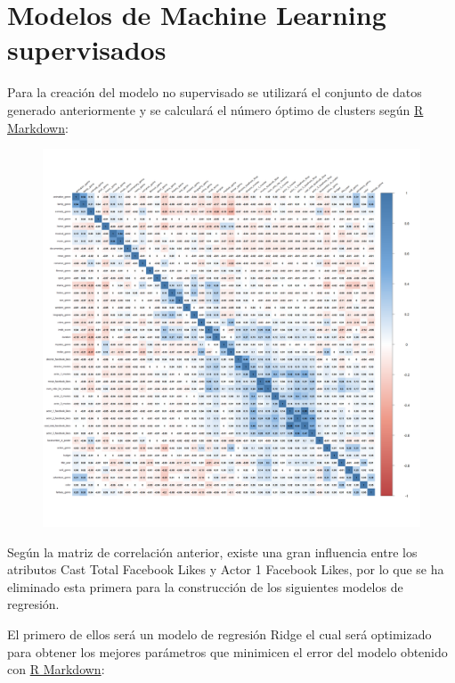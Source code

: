\documentclass{article}
\begin{document}
\clearpage

\section{Modelos de Machine Learning supervisados}

Para la creación del modelo no supervisado se utilizará el conjunto de datos generado anteriormente y se calculará el número óptimo de clusters según \href{https://github.com/pozueco/proyecto_fin_de_master/blob/master/model_supervised.md}{R Markdown}:

\begin{figure}[h]
\centering
\includegraphics[width=6in,clip,keepaspectratio]{./model_supervised_files/figure-markdown_github/unnamed-chunk-3-1}
\end{figure}

\clearpage

Según la matriz de correlación anterior, existe una gran influencia entre los atributos Cast Total Facebook Likes y Actor 1 Facebook Likes, por lo que se ha eliminado esta primera para la construcción de los siguientes modelos de regresión.

El primero de ellos será un modelo de regresión Ridge\cite{glmnet} el cual será optimizado para obtener los mejores parámetros que minimicen el error del modelo obtenido con \href{https://github.com/pozueco/proyecto_fin_de_master/blob/master/model_supervised.md}{R Markdown}:
\end{document}
